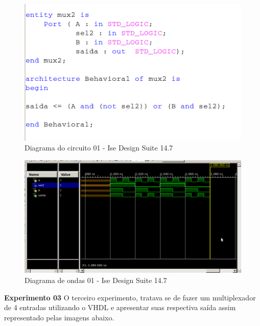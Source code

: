 \documentclass[12pts]{article}
\begin{document}
\begin{figure}[!htb]
  \centering
  \includegraphics[scale=0.5]{img/vhdl02}
  \caption{Diagrama do circuito 01 - Ise Design Suite 14.7}
  \label{figRotulo}
\end{figure}

\begin{figure}[!htb]
  \centering
  \includegraphics[scale=0.4]{img/mux2}
  \caption{Diagrama de ondas 01 - Ise Design Suite 14.7}
  \label{figRotulo}
\end{figure}

\newpage

\textbf{Experimento 03}
\singlespacing
	O terceiro experimento, tratava se de fazer um multiplexador de 4 entradas utilizando o VHDL e apresentar suas respectiva saída assim representado pelas imagens abaixo.
\end{document}
